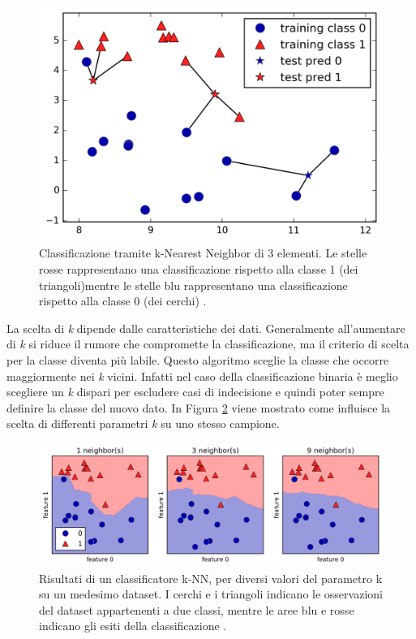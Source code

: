 \documentclass[a4paper,12pt]{report}
\begin{document}
\begin{figure}[ht]
    \centering
    \includegraphics[scale = 0.2]{images/knearest_3_vicini.png}
    \caption{Classificazione tramite k-Nearest Neighbor di 3 elementi. Le stelle rosse rappresentano una classificazione rispetto alla classe 1 (dei triangoli)mentre le stelle blu rappresentano una classificazione rispetto alla classe 0 (dei cerchi) \cite{figure_copyright}.}
    \label{fig:knearest_3_vicini}
\end{figure}

La scelta di \textit{k} dipende dalle caratteristiche dei dati. Generalmente all'aumentare di \textit{k} si riduce il rumore che compromette la classificazione, ma il criterio di scelta per la classe diventa più labile.
Questo algoritmo sceglie la classe che occorre maggiormente nei \textit{k} vicini. Infatti nel caso della classificazione binaria è meglio scegliere un \textit{k} dispari per escludere casi di indecisione e quindi poter sempre definire la classe del nuovo dato. In Figura \ref{fig:differenza_vicini} viene mostrato come influisce la scelta di differenti parametri \textit{k} su uno stesso campione.

\begin{figure}[ht]
    \centering
    \includegraphics[scale = 0.2]{images/knearest_differenza_vicini.png}
    \caption{Risultati di un classificatore k-NN, per diversi valori del parametro k su un medesimo dataset. I cerchi e i triangoli indicano le osservazioni del dataset appartenenti a due classi, mentre le aree blu e rosse indicano gli esiti della classificazione \cite{figure_copyright}.}
    \label{fig:differenza_vicini}
\end{figure}
\end{document}
